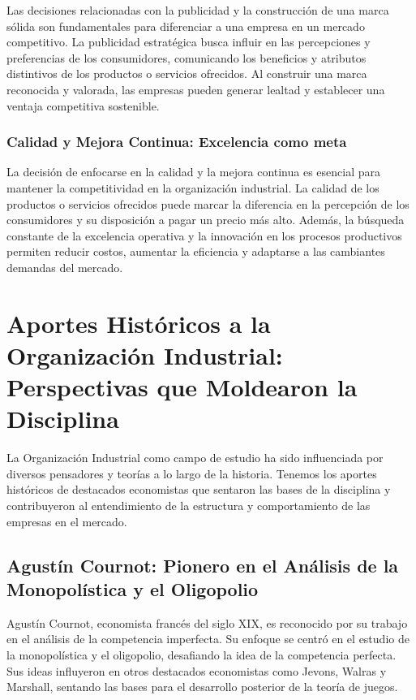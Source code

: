 \documentclass[
  doc,
  floatsintext,
  longtable,
  a4paper,
  nolmodern,
  notxfonts,
  notimes,
  12pt,
  colorlinks=true,linkcolor=blue,citecolor=blue,urlcolor=blue]{apa7}
\begin{document}
Las decisiones relacionadas con la publicidad y la construcción de una
marca sólida son fundamentales para diferenciar a una empresa en un
mercado competitivo. La publicidad estratégica busca influir en las
percepciones y preferencias de los consumidores, comunicando los
beneficios y atributos distintivos de los productos o servicios
ofrecidos. Al construir una marca reconocida y valorada, las empresas
pueden generar lealtad y establecer una ventaja competitiva sostenible.

\subsubsection{Calidad y Mejora Continua: Excelencia como
meta}\label{calidad-y-mejora-continua-excelencia-como-meta}

La decisión de enfocarse en la calidad y la mejora continua es esencial
para mantener la competitividad en la organización industrial. La
calidad de los productos o servicios ofrecidos puede marcar la
diferencia en la percepción de los consumidores y su disposición a pagar
un precio más alto. Además, la búsqueda constante de la excelencia
operativa y la innovación en los procesos productivos permiten reducir
costos, aumentar la eficiencia y adaptarse a las cambiantes demandas del
mercado.

\section{Aportes Históricos a la Organización Industrial: Perspectivas
que Moldearon la
Disciplina}\label{aportes-histuxf3ricos-a-la-organizaciuxf3n-industrial-perspectivas-que-moldearon-la-disciplina}

La Organización Industrial como campo de estudio ha sido influenciada
por diversos pensadores y teorías a lo largo de la historia. Tenemos los
aportes históricos de destacados economistas que sentaron las bases de
la disciplina y contribuyeron al entendimiento de la estructura y
comportamiento de las empresas en el mercado.

\subsection{Agustín Cournot: Pionero en el Análisis de la Monopolística
y el
Oligopolio}\label{agustuxedn-cournot-pionero-en-el-anuxe1lisis-de-la-monopoluxedstica-y-el-oligopolio}

Agustín Cournot, economista francés del siglo XIX, es reconocido por su
trabajo en el análisis de la competencia imperfecta. Su enfoque se
centró en el estudio de la monopolística y el oligopolio, desafiando la
idea de la competencia perfecta. Sus ideas influyeron en otros
destacados economistas como Jevons, Walras y Marshall, sentando las
bases para el desarrollo posterior de la teoría de juegos.
\end{document}
